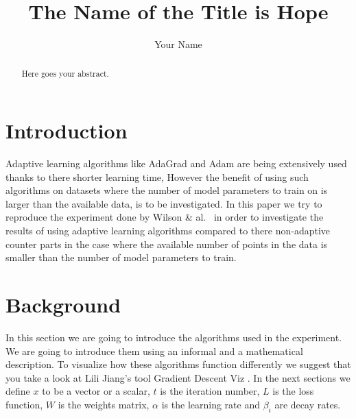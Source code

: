 \documentclass[sigconf]{acmart}
\begin{document}
\renewcommand\footnotetextcopyrightpermission[1]{} %
\pagestyle{plain} %


\title{The Name of the Title is Hope}
\author{Your Name}




\begin{abstract}
 Here goes your abstract.
\end{abstract}







\maketitle

\section{Introduction}
Adaptive learning algorithms like AdaGrad and Adam are being extensively used thanks to there shorter learning time, However the benefit of using such algorithms on datasets where the number of model parameters to train on is larger than the available data, is to be investigated.
In this paper we try to reproduce the experiment done by Wilson \& al.~\cite{wilson2017marginal} in order to investigate the results of using adaptive learning algorithms compared to there non-adaptive counter parts in the case where the available number of points in the data is smaller than the number of model parameters to train.



\section{Background}
In this section we are going to introduce the algorithms used in the experiment. We are going to introduce them using an informal and a mathematical description. To visualize how these algorithms function differently we suggest that you take a look at Lili Jiang's tool Gradient Descent Viz \cite{lilipads}.\newline
In the next sections we define $x$ to be a vector or a scalar, $t$ is the iteration number, $L$ is the loss function, $W$ is the weights matrix, $\alpha$ is the learning rate and $\beta_i$ are decay rates. 
\end{document}
